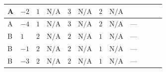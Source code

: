 \documentclass[8pt]{article}
\begin{document}
\begin{landscape}
\begin{longtable}{@{}llcccccc >{\raggedright\arraybackslash}p{0.21\linewidth} >{\raggedright\arraybackslash}p{0.21\linewidth} >{\raggedright\arraybackslash}p{0.21\linewidth}@{}}
\midrule
A & $-2$ & $1$ & $\text{N/A}$ & $3$ & $\text{N/A}$ & $2$ & $\text{N/A}$ & \scriptsize\adjustbox{max width=\linewidth}{$\begin{gathered} +4 {\lambda_{X_{12}}} \left({\lambda_{X_{12}}}\right)^{*}\end{gathered}$} & \scriptsize\adjustbox{max width=\linewidth}{$\begin{gathered} -12 {g_2}^2 {\lambda_{12}^{(1)}}\end{gathered}$} & \scriptsize\adjustbox{max width=\linewidth}{$\begin{gathered} -6 {g_1}^2 {\lambda_{12}^{(1)}}\end{gathered}$} \\
\midrule
A & $-4$ & $1$ & $\text{N/A}$ & $3$ & $\text{N/A}$ & $2$ & $\text{N/A}$ & --- & \scriptsize\adjustbox{max width=\linewidth}{$\begin{gathered} -12 {g_2}^2 {\lambda_{12}^{(1)}}\end{gathered}$} & \scriptsize\adjustbox{max width=\linewidth}{$\begin{gathered} -30 {g_1}^2 {\lambda_{12}^{(1)}}\end{gathered}$} \\
\midrule
B & $1$ & $2$ & $\text{N/A}$ & $2$ & $\text{N/A}$ & $1$ & $\text{N/A}$ & --- & \scriptsize\adjustbox{max width=\linewidth}{$\begin{gathered} -9 {g_2}^2 {\lambda_{12}^{(1)}}\end{gathered}$} & \scriptsize\adjustbox{max width=\linewidth}{$\begin{gathered} -15 {g_1}^2 {\lambda_{12}^{(1)}}\end{gathered}$} \\
\midrule
B & $-1$ & $2$ & $\text{N/A}$ & $2$ & $\text{N/A}$ & $1$ & $\text{N/A}$ & --- & \scriptsize\adjustbox{max width=\linewidth}{$\begin{gathered} -9 {g_2}^2 {\lambda_{12}^{(1)}}\end{gathered}$} & \scriptsize\adjustbox{max width=\linewidth}{$\begin{gathered} -3 {g_1}^2 {\lambda_{12}^{(1)}}\end{gathered}$} \\
\midrule
B & $-3$ & $2$ & $\text{N/A}$ & $2$ & $\text{N/A}$ & $1$ & $\text{N/A}$ & --- & \scriptsize\adjustbox{max width=\linewidth}{$\begin{gathered} -9 {g_2}^2 {\lambda_{12}^{(1)}}\end{gathered}$} & \scriptsize\adjustbox{max width=\linewidth}{$\begin{gathered} -15 {g_1}^2 {\lambda_{12}^{(1)}}\end{gathered}$} \\

\end{longtable}
\end{landscape}
\end{document}
